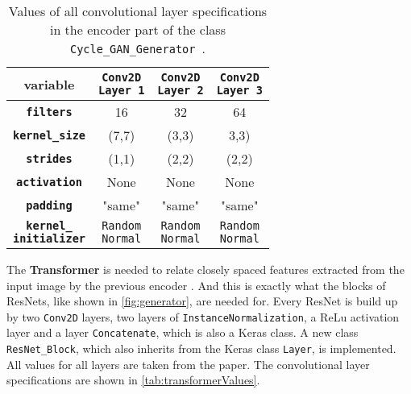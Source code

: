 \documentclass[fleqn,10pt]{SelfArx} %
\begin{document}
\begin{table}[htb]
\centering
\caption{Values of all convolutional layer specifications in the encoder part of the class \texttt{Cycle\_GAN\_Generator}~\cite{image-to-image-ccan}.}
\label{tab:encoderValues}
\begin{tabular}{c c c c}
\textbf{variable} & \makecell[cc]{\textbf{\texttt{Conv2D}} \\ \textbf{\texttt{Layer 1}}} & \makecell[cc]{\textbf{\texttt{Conv2D}} \\ \textbf{\texttt{Layer 2}}} & \makecell[cc]{\textbf{\texttt{Conv2D}} \\ \textbf{\texttt{Layer 3}}} \\ \hline
\textbf{\texttt{filters}} & 16 & 32 & 64 \\ \hline
\textbf{\texttt{kernel\_size}} & (7,7) & (3,3) & 3,3) \\ \hline
\textbf{\texttt{strides}} & (1,1) &  (2,2) & (2,2) \\ \hline
\textbf{\texttt{activation}} & None & None & None \\ \hline 
\textbf{\texttt{padding}} & "same" & "same" & "same" \\ \hline
\makecell[cc]{\textbf{\texttt{kernel\_}} \\ \textbf{\texttt{initializer}}} & \makecell[cc]{\texttt{Random} \\ \texttt{Normal}} & \makecell[cc]{\texttt{Random} \\ \texttt{Normal}} & \makecell[cc]{\texttt{Random} \\ \texttt{Normal}} \\ \hline
\end{tabular}
\end{table}

The \textbf{Transformer} is needed to relate closely spaced features extracted from the input image by the previous encoder \cite{Introduction-to-Cycle-GANs}. And this is exactly what the blocks of \acp{ResNet}, like shown in \autoref{fig:generator}, are needed for. Every \ac{ResNet} is build up by two \texttt{Conv2D} layers, two layers of \texttt{InstanceNormalization}, a \ac{ReLu} activation layer and a layer \texttt{Concatenate}, which is also a Keras class. A new class \texttt{ResNet\_Block}, which also inherits from the Keras class \texttt{Layer}, is implemented. All values for all layers are taken from the paper. The convolutional layer specifications are shown in \autoref{tab:transformerValues}.
\end{document}
